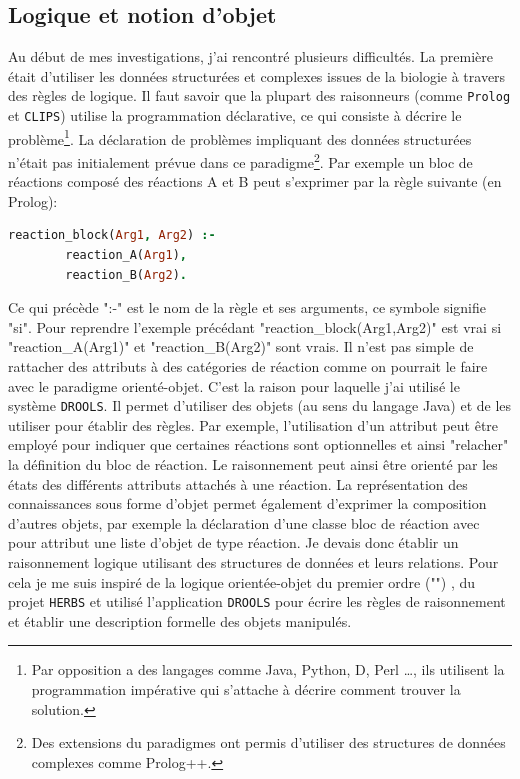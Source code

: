 \begin{refsegment}


\subsection{Logique et notion d'objet}

Au début de mes investigations, j'ai rencontré plusieurs difficultés. La première était d'utiliser les données structurées et complexes issues de la biologie à travers des règles de logique. Il faut savoir que la plupart des raisonneurs (comme \texttt{Prolog} et \texttt{CLIPS}) utilise la programmation déclarative, ce qui consiste à décrire le problème\footnote{Par opposition a des langages comme Java, Python, D, Perl \ldots, ils utilisent la programmation impérative qui s'attache à décrire comment trouver la solution.}. La déclaration de problèmes impliquant  des données structurées n'était pas initialement prévue dans ce paradigme\footnote{Des extensions du paradigmes ont permis d'utiliser des structures de données complexes comme Prolog++.}. Par exemple un bloc de réactions composé des réactions A et B peut s'exprimer par la règle suivante (en Prolog):

\begin{lstlisting}[basicstyle=\small\normalfont\ttfamily,language=Prolog]
    reaction_block(Arg1, Arg2) :-
        reaction_A(Arg1),
        reaction_B(Arg2).
\end{lstlisting}

Ce qui précède  ":-" est le nom de la règle et ses arguments, ce symbole signifie "si". Pour reprendre l'exemple précédant "reaction\_block(Arg1,Arg2)" est vrai si "reaction\_A(Arg1)" et "reaction\_B(Arg2)" sont vrais. Il n'est pas simple de rattacher des attributs à des catégories de réaction comme on pourrait le faire avec le paradigme orienté-objet. C'est la raison pour laquelle j'ai utilisé le système \texttt{DROOLS}. Il permet d'utiliser des objets (au sens du langage Java)  et de les utiliser pour établir des règles. Par exemple, l'utilisation d'un attribut peut être employé pour indiquer que certaines réactions sont optionnelles et ainsi "relacher" la définition du bloc de réaction. Le raisonnement peut ainsi être orienté par les états des différents attributs attachés à une réaction. La représentation des connaissances sous forme d'objet permet également d'exprimer la composition d'autres objets, par exemple la déclaration d'une classe bloc de réaction avec pour attribut une liste d'objet de type réaction. Je devais donc établir un raisonnement logique utilisant des structures de données et leurs relations. Pour cela je me suis inspiré de la logique orientée-objet du premier ordre ("") \cite{amir1999object}, du projet \texttt{\gls{HERBS}} et utilisé l'application \texttt{DROOLS} pour écrire les règles de raisonnement et établir une description formelle des objets manipulés.


\end{refsegment}
